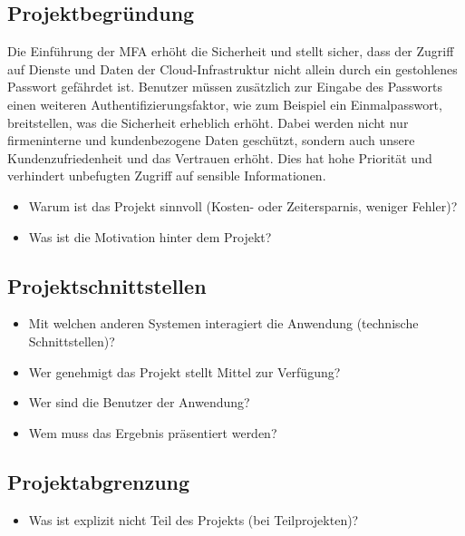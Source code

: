 \subsection{Projektbegründung} 
\label{sec:Projektbegruendung}
Die Einführung der MFA erhöht die Sicherheit und stellt sicher, dass der Zugriff 
auf Dienste und Daten der Cloud-Infrastruktur nicht allein durch ein gestohlenes
Passwort gefährdet ist.
Benutzer müssen zusätzlich zur Eingabe des Passworts einen weiteren Authentifizierungsfaktor, 
wie zum Beispiel ein Einmalpasswort, breitstellen, was die Sicherheit erheblich erhöht. 
Dabei werden nicht nur firmeninterne und kundenbezogene Daten geschützt, sondern auch 
unsere Kundenzufriedenheit und das Vertrauen erhöht. Dies hat hohe Priorität und 
verhindert unbefugten Zugriff auf sensible Informationen. 
\begin{itemize}
	\item Warum ist das Projekt sinnvoll (\zB Kosten- oder Zeitersparnis, weniger Fehler)?
	\item Was ist die Motivation hinter dem Projekt?
\end{itemize}


\subsection{Projektschnittstellen} 
\label{sec:Projektschnittstellen}
\begin{itemize}
	\item Mit welchen anderen Systemen interagiert die Anwendung (technische Schnittstellen)?
	\item Wer genehmigt das Projekt \bzw stellt Mittel zur Verfügung? 
	\item Wer sind die Benutzer der Anwendung?
	\item Wem muss das Ergebnis präsentiert werden?
\end{itemize}


\subsection{Projektabgrenzung} 
\label{sec:Projektabgrenzung}
\begin{itemize}
	\item Was ist explizit nicht Teil des Projekts (\insb bei Teilprojekten)?
\end{itemize}
